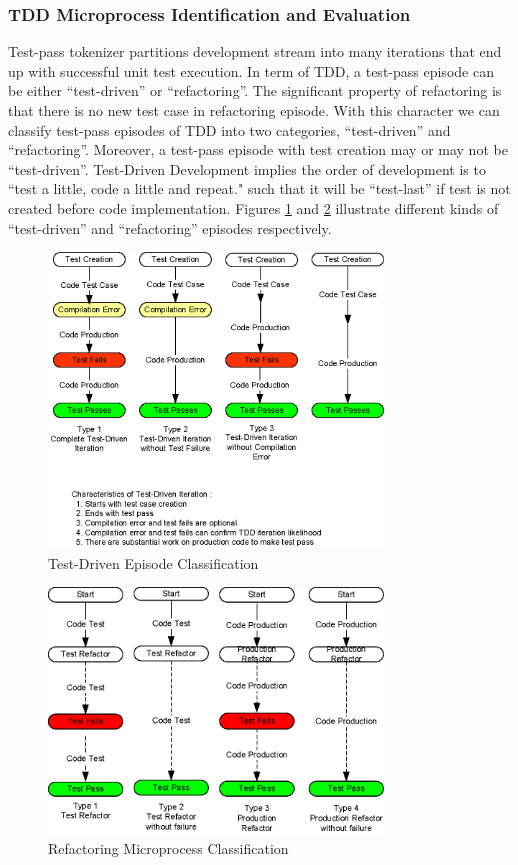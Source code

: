 \subsubsection{TDD Microprocess Identification and Evaluation}
Test-pass tokenizer partitions development stream into many iterations that
end up with successful unit test execution. In term of TDD, a test-pass
episode can be either ``test-driven'' or ``refactoring''. The significant
property of refactoring is that there is no new test case in refactoring 
episode. With this character we can classify test-pass episodes of TDD into 
two categories, ``test-driven'' and ``refactoring''.  Moreover, a test-pass 
episode with test creation may or may not be ``test-driven''.  Test-Driven 
Development implies the order of development is to ``test a little, code a 
little and repeat."\cite{Beck:03} such that it will be ``test-last'' if test 
is not created before code implementation. Figures \ref{fig:tdd} and
\ref{fig:refactoring} illustrate different kinds of ``test-driven'' and 
``refactoring'' episodes respectively.

\begin{figure}[h] 
  \centering
  \includegraphics[width=0.8\textwidth]{figs/TDD.eps}
  \caption{Test-Driven Episode Classification}\label{fig:tdd}
\end{figure} 

\pagebreak
\begin{figure}[h] 
  \centering
  \includegraphics[width=0.8\textwidth]{figs/Refactoring.eps}
  \caption{Refactoring Microprocess Classification}\label{fig:refactoring}
\end{figure} 

